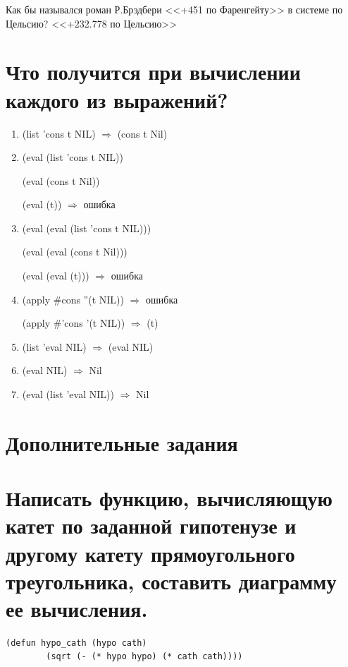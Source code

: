 Как бы назывался роман Р.Брэдбери <<+451 по Фаренгейту>> в системе по Цельсию? 
<<+232.778 по Цельсию>>

\newpage
\section{Что получится при вычислении каждого из выражений?}
\begin{enumerate}
	\item (list 'cons t NIL) $\Rightarrow$ (cons t Nil)
	\item (eval (list 'cons t NIL))
	
	(eval (cons t Nil)) 
	
	(eval (t)) $\Rightarrow$ ошибка
	
	\item (eval (eval (list 'cons t NIL)))
	
	(eval (eval (cons t Nil)))
	
	(eval (eval (t))) $\Rightarrow$ ошибка
	
	\item (apply \#cons ''(t NIL)) $\Rightarrow$ ошибка
	
	(apply \#'cons '(t NIL)) $\Rightarrow$ (t)
	
	\item (list 'eval NIL) $\Rightarrow$ (eval NIL)
	\item (eval NIL) $\Rightarrow$ Nil
	\item (eval (list 'eval NIL)) $\Rightarrow$ Nil
\end{enumerate}

\newpage
\section*{Дополнительные задания}
\section{Написать функцию, вычисляющую катет по заданной гипотенузе и другому катету прямоугольного треугольника, составить диаграмму ее вычисления.}

\begin{lstlisting}[caption=Дополнительное задание 1.]
	(defun hypo_cath (hypo cath) 
		(sqrt (- (* hypo hypo) (* cath cath))))
\end{lstlisting}

